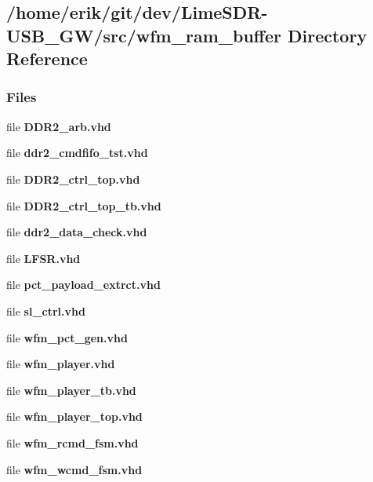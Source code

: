 \subsection{/home/erik/git/dev/\+Lime\+S\+D\+R-\/\+U\+S\+B\+\_\+\+G\+W/src/wfm\+\_\+ram\+\_\+buffer Directory Reference}
\label{dir_129fc6a9c514fb5f533659819805557b}
\subsubsection*{Files}
\begin{DoxyCompactItemize}
\item 
file {\bf D\+D\+R2\+\_\+arb.\+vhd}
\item 
file {\bf ddr2\+\_\+cmdfifo\+\_\+tst.\+vhd}
\item 
file {\bf D\+D\+R2\+\_\+ctrl\+\_\+top.\+vhd}
\item 
file {\bf D\+D\+R2\+\_\+ctrl\+\_\+top\+\_\+tb.\+vhd}
\item 
file {\bf ddr2\+\_\+data\+\_\+check.\+vhd}
\item 
file {\bf L\+F\+S\+R.\+vhd}
\item 
file {\bf pct\+\_\+payload\+\_\+extrct.\+vhd}
\item 
file {\bf sl\+\_\+ctrl.\+vhd}
\item 
file {\bf wfm\+\_\+pct\+\_\+gen.\+vhd}
\item 
file {\bf wfm\+\_\+player.\+vhd}
\item 
file {\bf wfm\+\_\+player\+\_\+tb.\+vhd}
\item 
file {\bf wfm\+\_\+player\+\_\+top.\+vhd}
\item 
file {\bf wfm\+\_\+rcmd\+\_\+fsm.\+vhd}
\item 
file {\bf wfm\+\_\+wcmd\+\_\+fsm.\+vhd}
\end{DoxyCompactItemize}
